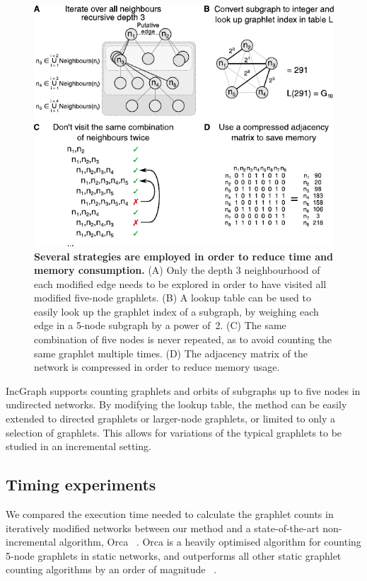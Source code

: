 \begin{figure}[ht!]
	\centering
	\includegraphics[width=.7\linewidth]{fig/figure2.pdf}
	\caption{{\bf Several strategies are employed in order to reduce time and memory consumption.}
		(A) Only the depth 3 neighbourhood of each modified edge needs to be explored in order to have visited all modified five-node graphlets. (B) A lookup table can be used to easily look up the graphlet index of a subgraph, by weighing each edge in a 5-node subgraph by a power of~2. (C) The same combination of five nodes is never repeated, as to avoid counting the same graphlet multiple times. (D) The adjacency matrix of the network is compressed in order to reduce memory usage.}
	\label{fig_efficient}
\end{figure}

IncGraph supports counting graphlets and orbits of subgraphs up to five nodes in undirected networks. By modifying the lookup table, the method can be easily extended to directed graphlets or larger-node graphlets, or limited to only a selection of graphlets. This allows for variations of the typical graphlets to be studied in an incremental setting.

\subsection*{Timing experiments}
We compared the execution time needed to calculate the graphlet counts in iteratively modified networks between our method and a state-of-the-art non-incremental algorithm, Orca~ \cite{hocevar_combinatorialapproachgraphlet_2014}. Orca is a heavily optimised algorithm for counting 5-node graphlets in static networks, and outperforms all other static graphlet counting algorithms by an order of magnitude~ \cite{hocevar_combinatorialapproachgraphlet_2014}.

